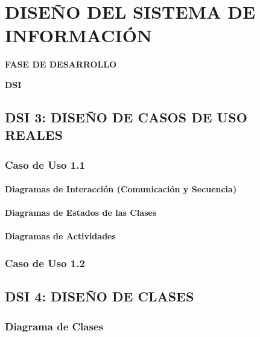 \newpage
\chapter{DISEÑO DEL SISTEMA DE INFORMACIÓN}
	\vspace{2cm}	
	\begin{center}
	{\Large \textbf{FASE DE DESARROLLO} \par}
	\end{center}
	\vspace{5cm}
	
	\begin{center}
	\Huge \textbf{DSI}\par
	\end{center}

\newpage


\section{DSI 3: DISEÑO DE CASOS DE USO REALES}

\subsection{Caso de Uso 1.1} 

\subsubsection{Diagramas de Interacción (Comunicación y Secuencia)} 

\subsubsection{Diagramas de Estados de las Clases} 
 
\subsubsection{Diagramas de Actividades} 


\subsection{Caso de Uso 1.2}


\newpage
\section{DSI 4: DISEÑO DE CLASES}

\subsection{Diagrama de Clases}


